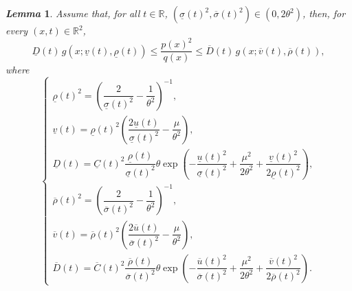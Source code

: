\documentclass[review]{elsarticle}
\newtheorem{lemma}{\em Lemma}
\begin{document}
{\begin{lemma}
\label{lem:bounds_p2_over_q}
Assume that, for all $t \in \mathbb{R}$, $(\underline{\sigma}(t)^2,\overline{\sigma}(t)^2)\in (0,2\theta^2)$, then, for every $(x,t) \in \mathbb{R}^2$,
\begin{equation}
\underline{D}(t)\, g(x;\underline{v}(t),\underline{\rho}(t)) \leq
\frac{p(x)^2}{q(x)}\leq \overline{D}(t)\, g(x;\overline{v}(t),\overline{\rho}(t)),
\label{eq:boundp2q}
\end{equation}
where
\begin{equation}
\begin{cases}
\underline{\rho}(t)^2
=
\left(\dfrac{2}{\underline{\sigma}(t)^2}-\dfrac{1}{\theta^2}\right)^{-1},\\[2ex]
\underline{v}(t)
=
\underline{\rho}(t)^2
\left(
\dfrac{2\underline{u}(t)}{\underline{\sigma}(t)^2}
-\dfrac{\mu}{\theta^2}
\right),\\[2ex]
\underline{D}(t)
=
\underline{C}(t)^2
\dfrac{\underline{\rho}(t)}{\underline{\sigma}(t)^2}\theta
\exp\left(
-\dfrac{\underline{u}(t)^2}{\underline{\sigma}(t)^2}
+\dfrac{\mu^2}{2\theta^2}
+\dfrac{\underline{v}(t)^2}{2\underline{\rho}(t)^2}
\right),\\
\overline{\rho}(t)^2
=
\left(\dfrac{2}{\overline{\sigma}(t)^2}-\dfrac{1}{\theta^2}\right)^{-1},\\[2ex]
\overline{v}(t)
=
\overline{\rho}(t)^2
\left(
\dfrac{2\overline{u}(t)}{\overline{\sigma}(t)^2}
-\dfrac{\mu}{\theta^2}
\right),\\[2ex]
\overline{D}(t)
=
\overline{C}(t)^2
\dfrac{\overline{\rho}(t)}{\overline{\sigma}(t)^2}\theta
\exp\left(
-\dfrac{\overline{u}(t)^2}{\overline{\sigma}(t)^2}
+\dfrac{\mu^2}{2\theta^2}
+\dfrac{\overline{v}(t)^2}{2\overline{\rho}(t)^2}
\right).
\end{cases}
\end{equation}
\end{lemma}

}
\end{document}
